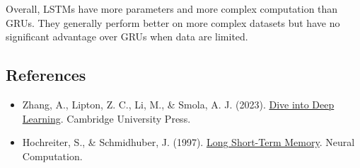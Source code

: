 Overall, LSTMs have more parameters and more complex computation than GRUs. They generally perform better on more complex datasets but have no significant advantage over GRUs when data are limited.

\FloatBarrier
{}
\hypertarget{references-21}{%
\subsection{References}\label{references-21}}

\vspace{0.25em}
\begin{itemize}
\tightlist
\item
  Zhang, A., Lipton, Z. C., Li, M., \& Smola, A. J. (2023). \href{https://D2L.ai}{Dive into Deep Learning}. Cambridge University Press.
\item
  Hochreiter, S., \& Schmidhuber, J. (1997). \href{https://doi.org/10.1162/neco.1997.9.8.1735}{Long Short-Term Memory}. Neural Computation.
\end{itemize}

\clearpage
